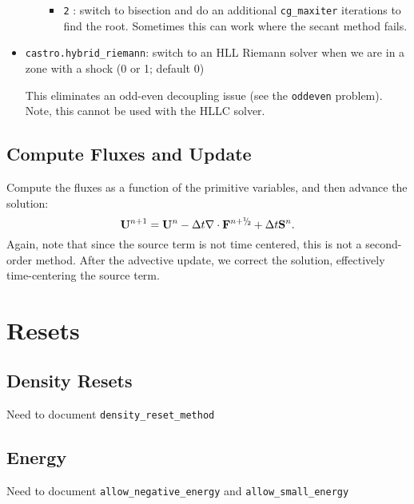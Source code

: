 \begin{itemize}
\begin{itemize}
\begin{itemize}
     \item {\tt 2} : switch to bisection and do an additional {\tt cg\_maxiter}
       iterations to find the root.  Sometimes this can work where the 
       secant method fails.
     \end{itemize}
  \end{itemize}

\item {\tt castro.hybrid\_riemann}: switch to an HLL Riemann solver when we are
  in a zone with a shock (0 or 1; default 0)

  This eliminates an odd-even decoupling issue (see the {\tt oddeven}
  problem).  Note, this cannot be used with the HLLC solver.
  
\end{itemize}




\subsection{Compute Fluxes and Update}

Compute the fluxes as a function of the primitive variables, and then
advance the solution:
\begin{equation}
\Ub^{n+1} = \Ub^n - \dt\nabla\cdot\Fb^\nph + \dt\Sb^n.
\end{equation}
Again, note that since the source term is not time centered, this is
not a second-order method.  After the advective update, we correct the
solution, effectively time-centering the source term.


\section{Resets}

\subsection{Density Resets}

Need to document {\tt density\_reset\_method}


\subsection{Energy}

Need to document {\tt allow\_negative\_energy} and {\tt allow\_small\_energy}


